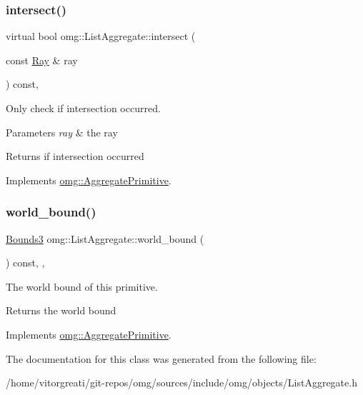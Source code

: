 \subsubsection{\texorpdfstring{intersect()}{intersect()}\hspace{0.1cm}{\footnotesize\ttfamily [2/2]}}
{\footnotesize\ttfamily virtual bool omg\+::\+List\+Aggregate\+::intersect (\begin{DoxyParamCaption}\item[{const \mbox{\hyperlink{classomg_1_1_ray}{Ray}} \&}]{ray }\end{DoxyParamCaption}) const\hspace{0.3cm}{\ttfamily [inline]}, {\ttfamily [virtual]}}



Only check if intersection occurred. 


\begin{DoxyParams}{Parameters}
{\em ray} & the ray \\
\hline
\end{DoxyParams}
\begin{DoxyReturn}{Returns}
if intersection occurred 
\end{DoxyReturn}


Implements \mbox{\hyperlink{classomg_1_1_aggregate_primitive_af6009e1c54b0f2341d78d95afb4268cc}{omg\+::\+Aggregate\+Primitive}}.

\mbox{\label{classomg_1_1_list_aggregate_a8c7b3a6c7c8a087355a1a35519c79555}} 
\subsubsection{\texorpdfstring{world\_bound()}{world\_bound()}}
{\footnotesize\ttfamily \mbox{\hyperlink{classomg_1_1_bounds3}{Bounds3}} omg\+::\+List\+Aggregate\+::world\+\_\+bound (\begin{DoxyParamCaption}{ }\end{DoxyParamCaption}) const\hspace{0.3cm}{\ttfamily [inline]}, {\ttfamily [override]}, {\ttfamily [virtual]}}



The world bound of this primitive. 

\begin{DoxyReturn}{Returns}
the world bound 
\end{DoxyReturn}


Implements \mbox{\hyperlink{classomg_1_1_aggregate_primitive_ad8a385aaa01354acffad18fe8f23fa25}{omg\+::\+Aggregate\+Primitive}}.



The documentation for this class was generated from the following file\+:\begin{DoxyCompactItemize}
\item 
/home/vitorgreati/git-\/repos/omg/sources/include/omg/objects/List\+Aggregate.\+h\end{DoxyCompactItemize}
